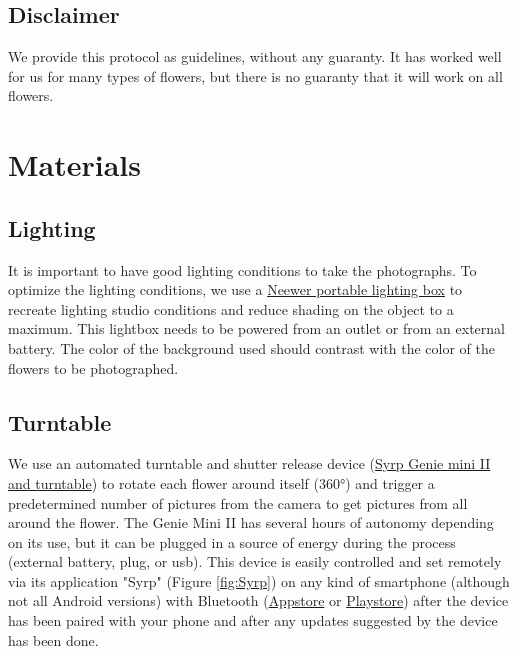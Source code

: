 \documentclass[
]{book}
\begin{document}
\hypertarget{disclaimer}{%
\section{Disclaimer}\label{disclaimer}}

We provide this protocol as guidelines, without any guaranty. It has worked well for us for many types of flowers, but there is no guaranty that it will work on all flowers.

\hypertarget{materials}{%
\chapter{Materials}\label{materials}}

\hypertarget{lighting}{%
\section{Lighting}\label{lighting}}

It is important to have good lighting conditions to take the
photographs. To optimize the lighting conditions, we use a \href{https://neewer.com/collections/shooting-tent}{Neewer
portable lighting box} to
recreate lighting studio conditions and reduce shading on the object to
a maximum. This lightbox needs to be powered from an outlet or from an
external battery. The color of the background used should contrast with
the color of the flowers to be photographed.

\hypertarget{turntable}{%
\section{Turntable}\label{turntable}}

We use an automated turntable and shutter release device (\href{https://www.bhphotovideo.com/c/product/1486043-REG/syrp_sykit_0043_genie_mini_ii_turntable.html/quick-compare}{Syrp Genie
mini II and turntable}) to rotate each flower around itself (360°) and trigger a predetermined number of pictures from the camera to get pictures from all around the flower. The Genie Mini II has several hours of autonomy depending on its use, but it can be plugged in a source of energy during the process (external battery, plug, or usb). This device is easily controlled and set remotely via its application "Syrp" (Figure \ref{fig:Syrp}) on any kind of smartphone (although not all Android versions) with Bluetooth (\href{https://apps.apple.com/us/app/syrp/id1387335063}{Appstore} or \href{https://play.google.com/store/apps/details?id=nz.co.syrp.genie2\&hl=fr_CA\&gl=US}{Playstore}) after the device has been paired with your phone and after any updates suggested by the device has been done.
\end{document}
